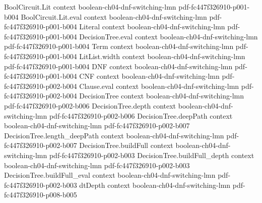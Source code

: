 \begin{theorem}
\label{LMN.circuit_reduction_depth3_le_eps}
\leanok
{}
\proofstep
  {BoolCircuit.Lit}
  {context}
  {boolean-ch04-dnf-switching-lmn}
  {pdf-fc447f326910-p001-b004}
\proofstep
  {BoolCircuit.Lit.eval}
  {context}
  {boolean-ch04-dnf-switching-lmn}
  {pdf-fc447f326910-p001-b004}
\proofstep
  {Literal}
  {context}
  {boolean-ch04-dnf-switching-lmn}
  {pdf-fc447f326910-p001-b004}
\proofstep
  {DecisionTree.eval}
  {context}
  {boolean-ch04-dnf-switching-lmn}
  {pdf-fc447f326910-p001-b004}
\proofstep
  {Term}
  {context}
  {boolean-ch04-dnf-switching-lmn}
  {pdf-fc447f326910-p001-b004}
\proofstep
  {LitList.width}
  {context}
  {boolean-ch04-dnf-switching-lmn}
  {pdf-fc447f326910-p001-b004}
\proofstep
  {DNF}
  {context}
  {boolean-ch04-dnf-switching-lmn}
  {pdf-fc447f326910-p001-b004}
\proofstep
  {CNF}
  {context}
  {boolean-ch04-dnf-switching-lmn}
  {pdf-fc447f326910-p002-b004}
\proofstep
  {Clause.eval}
  {context}
  {boolean-ch04-dnf-switching-lmn}
  {pdf-fc447f326910-p002-b004}
\proofstep
  {DecisionTree}
  {context}
  {boolean-ch04-dnf-switching-lmn}
  {pdf-fc447f326910-p002-b006}
\proofstep
  {DecisionTree.depth}
  {context}
  {boolean-ch04-dnf-switching-lmn}
  {pdf-fc447f326910-p002-b006}
\proofstep
  {DecisionTree.deepPath}
  {context}
  {boolean-ch04-dnf-switching-lmn}
  {pdf-fc447f326910-p002-b007}
\proofstep
  {DecisionTree.length_deepPath}
  {context}
  {boolean-ch04-dnf-switching-lmn}
  {pdf-fc447f326910-p002-b007}
\proofstep
  {DecisionTree.buildFull}
  {context}
  {boolean-ch04-dnf-switching-lmn}
  {pdf-fc447f326910-p002-b003}
\proofstep
  {DecisionTree.buildFull_depth}
  {context}
  {boolean-ch04-dnf-switching-lmn}
  {pdf-fc447f326910-p002-b003}
\proofstep
  {DecisionTree.buildFull_eval}
  {context}
  {boolean-ch04-dnf-switching-lmn}
  {pdf-fc447f326910-p002-b003}
\proofstep
  {dtDepth}
  {context}
  {boolean-ch04-dnf-switching-lmn}
  {pdf-fc447f326910-p008-b005}

\end{theorem}
